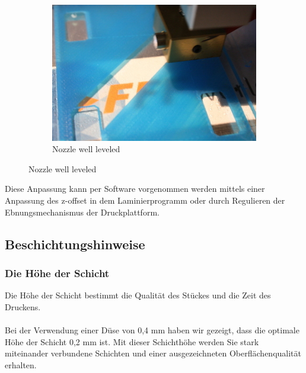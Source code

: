 \documentclass[11pt,a4paper]{article}
\begin{document}
\begin{figure}[H]
\begin{subfigure}[b]{0.3\textwidth}
        \includegraphics[width=\textwidth,cfbox=azul_marcos 3pt 0pt]{FOTOS/HOTENDPERFECTO}
	\caption*{Nozzle well leveled}
    \end{subfigure}
\end{figure}
Diese Anpassung kann per Software vorgenommen werden mittels einer Anpassung des z-offset in dem Laminierprogramm oder durch Regulieren der Ebnungsmechanismus der Druckplattform.
	\subsection{Beschichtungshinweise}
		\subsubsection{Die Höhe der Schicht}
Die Höhe der Schicht bestimmt die Qualität des Stückes und die Zeit des Druckens.
\\\\
Bei der Verwendung einer Düse von 0,4 mm haben wir gezeigt, dass die optimale Höhe der Schicht 0,2 mm ist. Mit dieser Schichthöhe werden Sie stark miteinander verbundene Schichten und einer ausgezeichneten Oberflächenqualität erhalten.
\end{document}
